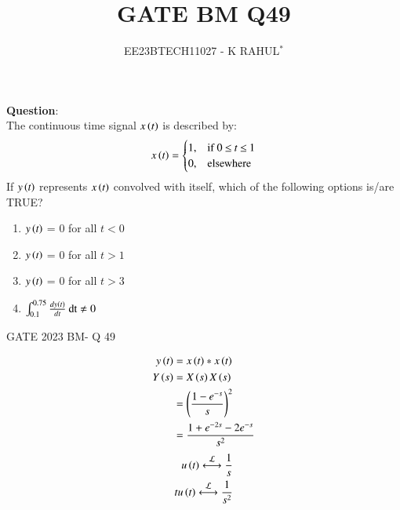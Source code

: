 \documentclass[journal,12pt,twocolumn]{IEEEtran}
\theoremstyle{remark}
\begin{document}

\vspace{3cm}
\title{GATE BM Q49}
\author{EE23BTECH11027 - K RAHUL$^{*}$%
}
\maketitle
\newpage
\bigskip
\renewcommand{\thefigure}{\theenumi}
\renewcommand{\thetable}{\theenumi}
\textbf{Question}:\\
The continuous time signal $x\left(t\right)$ is described by:
\begin{align}
x\left(t\right)=
    \begin{cases}
        1, & \text{if } 0\: {\displaystyle \leq }\:t\:{\displaystyle \leq }\:1\\
        0, & \text{elsewhere}
    \end{cases} 
\end{align}
If $y\left(t\right)$ represents $x\left(t\right)$ convolved with itself, which of the following options is/are TRUE?
\begin{enumerate}[label = (\Alph*)]
    \item $y\left(t\right)$ = 0 for all $t<0$ \label{gate.bm.49.a}\\
    \item $y\left(t\right)$ = 0 for all $t>1$ \label{gate.bm.49.b}\\
    \item $y\left(t\right)$ = 0 for all $t>3$ \label{gate.bm.49.c}\\
    \item $\int_{0.1}^{0.75} \frac{dy\left(t\right)}{dt}\: \text{dt} \neq 0$ \label{gate.bm.49.d}
\end{enumerate} \hfill{GATE 2023 BM- Q 49}\\
\bigskip 
\bigskip
\solution
\begin{table}[ht]

\end{table}
\bigskip
\begin{align}
    y\left(t\right) &= x\left(t\right) * x\left(t\right)\\
    Y\left(s\right) &= X\left(s\right)X\left(s\right)\\
    &=\left(\frac{1-e^{-s}}{s}\right)^2\\
    &=\frac{1+e^{-2s}-2e^{-s}}{s^2}
\end{align}
\begin{align}
u\brak{t} \system{L} \frac{1}{s}\\
tu\brak{t} \system{L} \frac{1}{s^2} \label{11027_lap_1}
\end{align}
	
\end{document}
